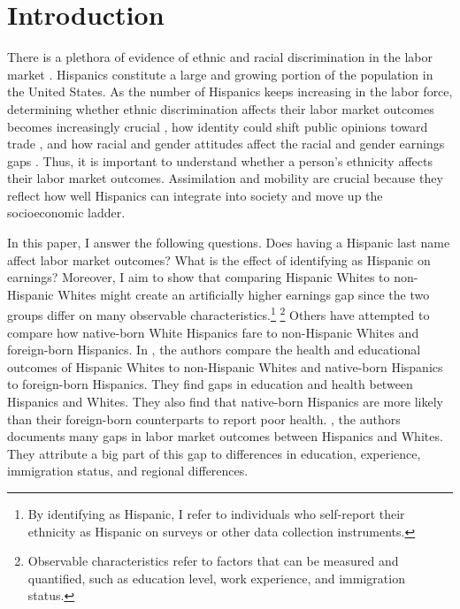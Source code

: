 \documentclass{wptemp}
\begin{document}
\section{Introduction}\label{sec:intro}

There is a plethora of evidence of ethnic and racial discrimination in the labor market \citep{bayer2018divergent, charles2008prejudice, card1992school, fryer2004causes, rubinstein2014pride, bertrand2004emily, juhn1991accounting}. Hispanics constitute a large and growing portion of the population in the United States. As the number of Hispanics keeps increasing in the labor force, determining whether ethnic discrimination affects their labor market outcomes becomes increasingly crucial \citep{chettyUnitedStatesStill2014, chettyEffectsExposureBetter2016,chettyFadingAmericanDream2017,abramitzkyImmigrantsAssimilateMore2020a, abramitzkyNationImmigrantsAssimilation2014,abramitzkyCulturalAssimilationAge2016,chettyWhereLandOpportunity2014}, how identity could shift public opinions toward trade \citep{grossmanIdentityPoliticsTrade2021}, and how racial and gender attitudes affect the racial and gender earnings gaps \citep{charlesPrejudiceWagesEmpirical2008,charlesEffectsSexismAmerican2018}. Thus, it is important to understand whether a person's ethnicity affects their labor market outcomes. Assimilation and mobility are crucial because they reflect how well Hispanics can integrate into society and move up the socioeconomic ladder.

In this paper, I answer the following questions. Does having a Hispanic last name affect labor market outcomes? What is the effect of identifying as Hispanic on earnings? Moreover, I aim to show that comparing Hispanic Whites to non-Hispanic Whites might create an artificially higher earnings gap since the two groups differ on many observable characteristics.\footnote{By identifying as Hispanic, I refer to individuals who self-report their ethnicity as Hispanic on surveys or other data collection instruments.} \footnote{Observable characteristics refer to factors that can be measured and quantified, such as education level, work experience, and immigration status.} Others have attempted to compare how native-born White Hispanics fare to non-Hispanic Whites and foreign-born Hispanics. In \citet{antman2020ethnic,antmanEthnicAttritionObserved2016,antmanEthnicAttritionObserved2016a,antmanEthnicAttritionAssimilation2020}, the authors compare the health and educational outcomes of Hispanic Whites to non-Hispanic Whites and native-born Hispanics to foreign-born Hispanics. They find gaps in education and health between Hispanics and Whites. They also find that native-born Hispanics are more likely than their foreign-born counterparts to report poor health. \citet{davilaChangesRelativeEarnings2008}, the authors documents many gaps in labor market outcomes between Hispanics and Whites. They attribute a big part of this gap to differences in education, experience, immigration status, and regional differences. 
\end{document}
